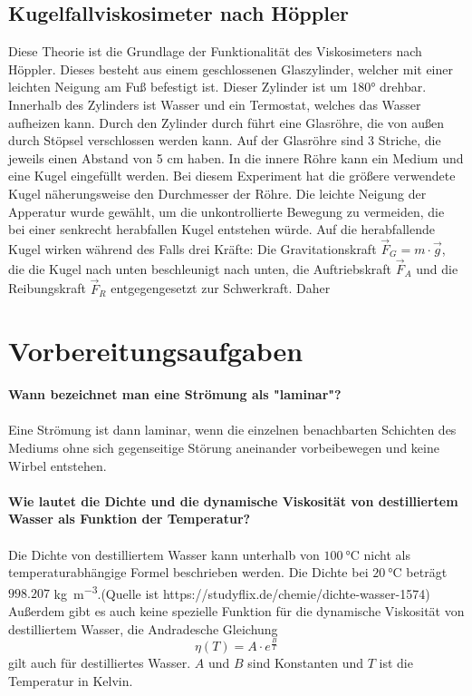 \subsection{Kugelfallviskosimeter nach Höppler}
Diese Theorie ist die Grundlage der Funktionalität des Viskosimeters 
nach Höppler. Dieses besteht aus einem geschlossenen Glaszylinder, 
welcher mit einer leichten Neigung am Fuß befestigt
ist. Dieser Zylinder ist um 180° drehbar. 
Innerhalb des Zylinders ist Wasser und ein Termostat, welches das Wasser aufheizen 
kann.
Durch den Zylinder durch führt eine Glasröhre, die von außen durch Stöpsel 
verschlossen werden kann. Auf der Glasröhre sind 3 Striche, die jeweils 
einen Abstand von 5 \unit{\centi\meter} haben. In die innere Röhre kann
ein Medium und eine Kugel eingefüllt werden. Bei diesem Experiment hat die 
größere verwendete Kugel näherungsweise den Durchmesser der Röhre. Die leichte
Neigung der Apperatur wurde gewählt, um die unkontrollierte Bewegung zu vermeiden, 
die bei einer senkrecht herabfallen Kugel entstehen würde. Auf die herabfallende Kugel
wirken während des Falls drei Kräfte: Die Gravitationskraft $\vec{F}_{G} = m \cdot \vec{g}$, 
die die Kugel nach unten beschleunigt nach unten, die Auftriebskraft $\vec{F}_{A}$ und die 
Reibungskraft $\vec{F}_{R}$ entgegengesetzt zur Schwerkraft. Daher      
%
%
%
\section{Vorbereitungsaufgaben}
\label{sec:Vorbereitungsaufgaben}
\textbf{Wann bezeichnet man eine Strömung als "laminar"?}\\
\\
Eine Strömung ist dann laminar, wenn die einzelnen benachbarten Schichten 
des Mediums ohne sich gegenseitige Störung aneinander vorbeibewegen und 
keine Wirbel entstehen. \\ 
\\
%
\textbf{Wie lautet die Dichte und die dynamische Viskosität von 
destilliertem Wasser als Funktion der Temperatur?}\\
\\
Die Dichte von destilliertem Wasser kann unterhalb von  
$\SI{100}{\celsius}$ nicht als temperaturabhängige Formel 
beschrieben werden.
Die Dichte bei $\SI{20}{\celsius}$ beträgt $998.207$ 
\unit[per-mode=fraction]{\kilo\gram\per\meter\tothe{3}}.(Quelle ist https://studyflix.de/chemie/dichte-wasser-1574)\\
Außerdem gibt es auch keine spezielle Funktion für die dynamische
Viskosität von destilliertem Wasser, die Andradesche Gleichung 
\begin{equation}
 \eta (T) = A \cdot e^{\frac{B}{T}}
 \label{equ:AndradescheGleichung}
\end{equation} 
gilt auch für destilliertes Wasser. $A$ und $B$ sind Konstanten und $T$ ist die Temperatur in Kelvin. 
